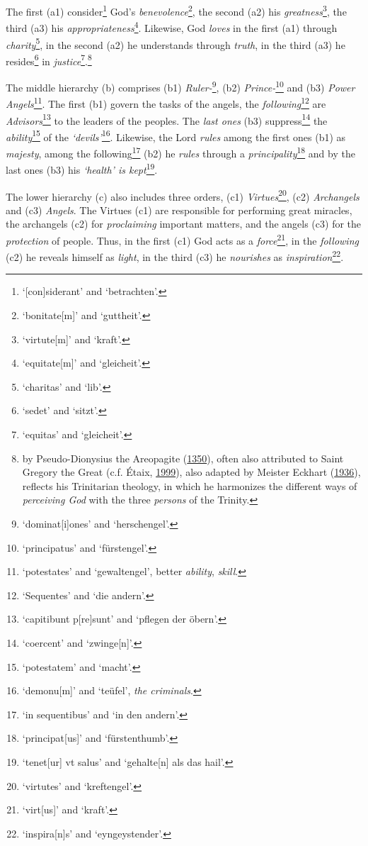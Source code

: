 \documentclass[
]{article}
\begin{document}
The first (a1) consider\footnote{`{[}con{]}siderant' and `betrachten'.}
God's \emph{benevolence}\footnote{`bonitate{[}m{]}' and `guttheit'.},
the second (a2) his \emph{greatness}\footnote{`virtute{[}m{]}' and
  `kraft'.}, the third (a3) \hspace{0pt}\hspace{0pt}his
\emph{appropriateness}\footnote{`equitate{[}m{]}' and `gleicheit'.}.
Likewise, God \emph{loves} in the first (a1) through
\emph{charity}\footnote{`charitas' and `lib'.}, in the second (a2) he
understands through \emph{truth}, in the third (a3)
\hspace{0pt}\hspace{0pt}he resides\footnote{`sedet' and `sitzt'.} in
\emph{justice}\footnote{`equitas' and `gleicheit'.}.\footnote{by
  Pseudo-Dionysius the Areopagite
  (\href{https://digital.bodleian.ox.ac.uk/objects/ee19a692-5066-4c84-95db-d93c4fc82b97/}{1350}),
  often also attributed to Saint Gregory the Great (c.f. Étaix,
  \href{https://books.google.com/books?id=r4ERnwEACAAJ}{1999}), also
  adapted by Meister Eckhart
  (\href{http://www.eckhart.de/opus.htm}{1936}), reflects his
  Trinitarian theology, in which he harmonizes the different ways of
  \emph{perceiving God} with the three \emph{persons} of the Trinity.}

The middle hierarchy (b) comprises (b1) \emph{Ruler-}\footnote{`dominat{[}i{]}ones'
  and `herschengel'.}, (b2) \emph{Prince-}\footnote{`principatus' and
  `fürstengel'.} and (b3) \emph{Power Angels}\footnote{`potestates' and
  `gewaltengel', better \emph{ability}, \emph{skill}.}. The first (b1)
govern the tasks of the angels, the \emph{following}\footnote{`Sequentes'
  and `die andern'.} are \emph{Advisors}\footnote{`capitibunt
  p{[}re{]}sunt' and `pflegen der öbern'.} to the leaders of the
peoples. The \emph{last ones} (b3) suppress\footnote{`coercent' and
  `zwinge{[}n{]}'.} the \emph{ability}\footnote{`potestatem' and
  `macht'.} of the \emph{`devils'}\footnote{`demonu{[}m{]}' and
  `teüfel', \emph{the criminals}.}. Likewise, the Lord \emph{rules}
among the first ones (b1) as \emph{majesty}, among the
following\footnote{`in sequentibus' and `in den andern'.} (b2) he
\emph{rules} through a \emph{principality}\footnote{`principat{[}us{]}'
  and `fürstenthumb'.} and by the last ones (b3) his \emph{`health' is
kept}\footnote{`tenet{[}ur{]} vt salus' and `gehalte{[}n{]} als das
  hail'.}.

The lower hierarchy (c) also includes three orders, (c1)
\emph{Virtues}\footnote{`virtutes' and `kreftengel'.}, (c2)
\emph{Archangels} and (c3) \emph{Angels}. The Virtues (c1) are
responsible for performing great miracles, the archangels (c2) for
\emph{proclaiming} important matters, and the angels (c3) for the
\emph{protection} of people. Thus, in the first (c1) God acts as a
\emph{force}\footnote{`virt{[}us{]}' and `kraft'.}, in the
\emph{following} (c2) he reveals himself as \emph{light}, in the third
(c3) he \emph{nourishes} as \emph{inspiration}\footnote{`inspira{[}n{]}s'
  and `eyngeystender'.}.
\end{document}
